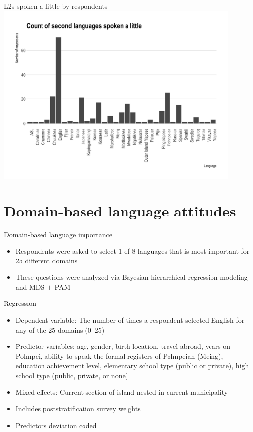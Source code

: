 \documentclass[10pt]{beamer}
\begin{document}
\begin{frame}{L2s spoken a little by respondents}
\includegraphics[width=0.9\textwidth]{figures/L2little.png}
\end{frame}

\section{Domain-based language attitudes}

\begin{frame}{Domain-based language importance}
\begin{itemize}
\item Respondents were asked to select 1 of 8 languages that is most important  for 25 different domains
\item These questions were analyzed via Bayesian hierarchical regression modeling and MDS $+$ PAM
\end{itemize}
\end{frame}


\begin{frame}{Regression}
\begin{itemize}
\item Dependent variable: The number of times a respondent selected English for any of the 25 domains (0--25)
\item Predictor variables: age, gender, birth location, travel abroad, years on Pohnpei, ability to speak the formal registers of Pohnpeian (Meing), education achievement level, elementary school type (public or private), high school type (public, private, or none)
\item Mixed effects: Current section of island nested in current municipality
\item Includes poststratification survey weights
\item Predictors deviation coded
\end{itemize}
\end{frame}
\end{document}
